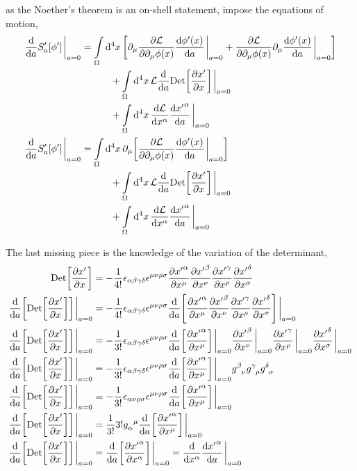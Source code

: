 as the Noether's theorem is an on-shell statement, impose the equations of motion,
\begin{align}
    \dv{}{a}S_a'\qty[\phi']\eval_{a=0}&= \int\limits_{\Omega}\dd[4]{x}\qty[\partial_\mu\pdv{\mathcal L}{\partial_\mu\phi\qty(x)}\dv{\phi'\qty(x)}{a}\eval_{a=0}+\pdv{\mathcal L}{\partial_{\mu}\phi\qty(x)}\partial_{\mu}\dv{\phi'\qty(x)}{a}\eval_{a=0}]\nonumber\\
    &\quad\quad\quad+\int\limits_{\Omega}\dd[4]{x}\mathcal L\dv{}{a}\Det\qty[\pdv{x'}{x}]\eval_{a= 0}\nonumber\\
    &\quad\quad\quad+\int\limits_{\Omega}\dd[4]{x}\dv{\mathcal L}{x^\alpha}\dv{{x'}^\alpha}{a}\eval_{a=0}\\
    \dv{}{a}S_a'\qty[\phi']\eval_{a=0}&= \int\limits_{\Omega}\dd[4]{x}\partial_\mu\qty[\pdv{\mathcal L}{\partial_\mu\phi\qty(x)}\dv{\phi'\qty(x)}{a}\eval_{a=0}]\nonumber\\
    &\quad\quad\quad+\int\limits_{\Omega}\dd[4]{x}\mathcal L\dv{}{a}\Det\qty[\pdv{x'}{x}]\eval_{a= 0}\nonumber\\
    &\quad\quad\quad+\int\limits_{\Omega}\dd[4]{x}\dv{\mathcal L}{x^\alpha}\dv{{x'}^\alpha}{a}\eval_{a=0}
\end{align}

The last missing piece is the knowledge of the variation of the determinant,
\begin{align}
    \Det\qty[\pdv{x'}{x}]&=-\frac{1}{4!}\epsilon_{\alpha\beta\gamma\delta}\epsilon^{\mu\nu\rho\sigma}\pdv{{x'}^\alpha}{x^\mu}\pdv{{x'}^\beta}{x^\nu}\pdv{{x'}^\gamma}{x^\rho}\pdv{{x'}^\delta}{x^\sigma}\\
    \dv{}{a}\qty[\Det\qty[\pdv{x'}{x}]]\eval_{a=0}&=-\frac{1}{4!}\epsilon_{\alpha\beta\gamma\delta}\epsilon^{\mu\nu\rho\sigma}\dv{}{a}\qty[\pdv{{x'}^\alpha}{x^\mu}\pdv{{x'}^\beta}{x^\nu}\pdv{{x'}^\gamma}{x^\rho}\pdv{{x'}^\delta}{x^\sigma}]\eval_{a=0}\\
    \dv{}{a}\qty[\Det\qty[\pdv{x'}{x}]]\eval_{a=0}&=-\frac{1}{3!}\epsilon_{\alpha\beta\gamma\delta}\epsilon^{\mu\nu\rho\sigma}\dv{}{a}\qty[\pdv{{x'}^\alpha}{x^\mu}]\eval_{a=0}\pdv{{x'}^\beta}{x^\nu}\eval_{a=0}\pdv{{x'}^\gamma}{x^\rho}\eval_{a=0}\pdv{{x'}^\delta}{x^\sigma}\eval_{a=0}\\
    \dv{}{a}\qty[\Det\qty[\pdv{x'}{x}]]\eval_{a=0}&=-\frac{1}{3!}\epsilon_{\alpha\beta\gamma\delta}\epsilon^{\mu\nu\rho\sigma}\dv{}{a}\qty[\pdv{{x'}^\alpha}{x^\mu}]\eval_{a=0}\tensor{g}{^\beta_\nu}\tensor{g}{^\gamma_\rho}\tensor{g}{^\delta_\sigma}\\
    \dv{}{a}\qty[\Det\qty[\pdv{x'}{x}]]\eval_{a=0}&=-\frac{1}{3!}\epsilon_{\alpha\nu\rho\sigma}\epsilon^{\mu\nu\rho\sigma}\dv{}{a}\qty[\pdv{{x'}^\alpha}{x^\mu}]\eval_{a=0}\\
    \dv{}{a}\qty[\Det\qty[\pdv{x'}{x}]]\eval_{a=0}&=\frac{1}{3!}3!\tensor{g}{_\alpha^\mu}\dv{}{a}\qty[\pdv{{x'}^\alpha}{x^\mu}]\eval_{a=0}\\
    \dv{}{a}\qty[\Det\qty[\pdv{x'}{x}]]\eval_{a=0}&=\dv{}{a}\qty[\pdv{{x'}^\alpha}{x^\alpha}]\eval_{a=0}=\dv{}{x^\alpha}\dv{{x'}^\alpha}{a}\eval_{a=0}
\end{align}

